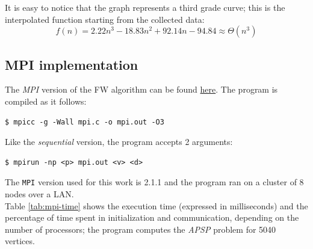 \documentclass[compsoc]{IEEEtran}
\begin{document}
It is easy to notice that the graph represents a 
third grade curve; this is the interpolated function starting from the collected data:
\[f(n) = 2.22n^3 - 18.83n^2 + 92.14n -94.84 \approx \Theta(n^3) \]



\subsection{MPI implementation}

The \emph{MPI} version of the FW algorithm can be found \href{https://github.com/firaja/Parallel-FloydWarshall/blob/master/mpi.c}{here}. 
The program is compiled as it follows:

\begin{lstlisting}[basicstyle=\footnotesize\ttfamily]
$ mpicc -g -Wall mpi.c -o mpi.out -O3
\end{lstlisting}
Like the \emph{sequential} version, the program accepts 2 arguments:
\begin{lstlisting}[basicstyle=\footnotesize\ttfamily]
$ mpirun -np <p> mpi.out <v> <d>
\end{lstlisting}
The \texttt{MPI} version used for this work is 2.1.1 and the program ran on a cluster of 8 nodes over a LAN. \\
Table \ref{tab:mpi-time} shows the execution time (expressed in milliseconds) and the percentage of time spent in initialization and communication, depending on the number of processors; 
the program computes the \emph{APSP} problem for 5040 vertices.
\end{document}

